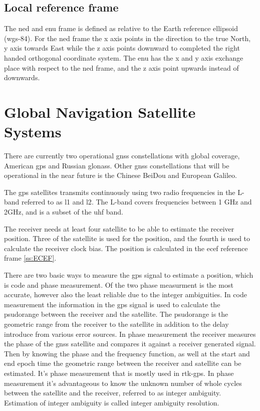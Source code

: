 \subsection{Local reference frame}
The \gls{ned} and \gls{enu} frame is defined as relative to the Earth reference ellipsoid (\gls{wgs-84}). For the \gls{ned} frame the x axis points in the direction to the true North, y axis towards East while the z axis points downward to completed the right handed orthogonal coordinate system. The \gls{enu} has the x and y axis exchange place with respect to the \gls{ned} frame, and the z axis point upwards instead of downwards.
\section{Global Navigation Satellite Systems}
There are currently two operational \gls{gnss} constellations with global coverage, American \gls{gps} and Russian \gls{glonass}. Other \gls{gnss} constellations that will be operational in the near future is the Chinese BeiDou and European Galileo.

The \gls{gps} satellites transmits continuously using two radio frequencies in the L-band referred to as \gls{l1} and \gls{l2}. The L-band covers frequencies between 1 GHz and 2GHz, and is a subset of the \gls{uhf} band.

The receiver needs at least four satellite to be able to estimate the receiver position. Three of the satellite is used for the position, and the fourth is used to calculate the receiver clock bias. The position is calculated in the \gls{ecef} reference frame \ref{ss:ECEF}. 

There are two basic ways to measure the \gls{gps} signal to estimate a position, which is code and phase measurement. Of the two phase measurment is the most accurate, however also the least reliable due to the integer ambiguities. In code measurement the information in the \gls{gps} signal is used to calculate the psudorange between the receiver and the satellite. The psudorange is the geometric range from the receiver to the satellite in addition to the delay introduce from various error sources. In phase measurement the receiver measures the phase of the \gls{gnss} satellite and compares it against a receiver generated signal. Then by knowing the phase and the frequency function, as well at the start and end epoch time the geometric range between the receiver and satellite can be estimated. It's phase measurement that is mostly used in \gls{rtk-gps}. In phase measurement it's advantageous to know the unknown number of whole cycles between the satellite and the receiver, referred to as integer ambiguity. Estimation of integer ambiguity is called integer ambiguity resolution.

